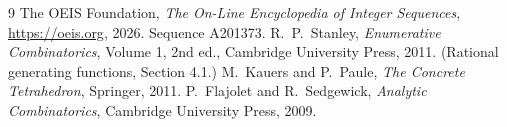 \documentclass[11pt,a4paper]{article}
\theoremstyle{plain}
\theoremstyle{definition}
\begin{document}
\begin{thebibliography}{9}
 The OEIS Foundation, \emph{The On-Line Encyclopedia of Integer
Sequences}, \url{https://oeis.org}, 2026. Sequence A201373.
 R.~P.~Stanley, \emph{Enumerative Combinatorics}, Volume 1, 2nd ed.,
Cambridge University Press, 2011. (Rational generating functions, Section 4.1.)
 M.~Kauers and P.~Paule, \emph{The Concrete Tetrahedron}, Springer, 2011.
 P.~Flajolet and R.~Sedgewick, \emph{Analytic Combinatorics}, Cambridge
University Press, 2009.
\end{thebibliography}
\end{document}
